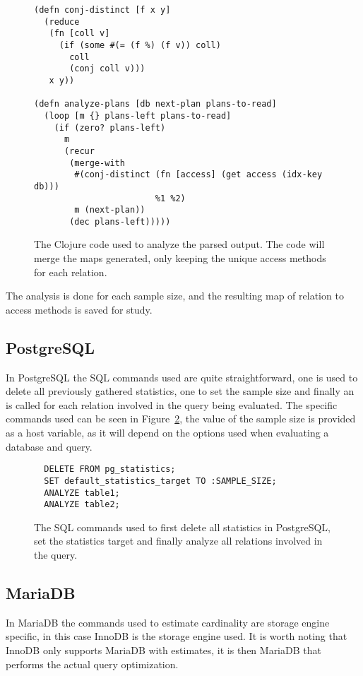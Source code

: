 \begin{figure}[ht]
\begin{verbatim}
(defn conj-distinct [f x y]
  (reduce
   (fn [coll v]
     (if (some #(= (f %) (f v)) coll)
       coll
       (conj coll v)))
   x y))

(defn analyze-plans [db next-plan plans-to-read]
  (loop [m {} plans-left plans-to-read]
    (if (zero? plans-left)
      m
      (recur
       (merge-with
        #(conj-distinct (fn [access] (get access (idx-key db)))
                        %1 %2)
        m (next-plan))
       (dec plans-left)))))
   \end{verbatim}
   \caption[The clojure code to analyze a query]{The Clojure code used to
     analyze the parsed output. The code will merge the maps generated, only
     keeping the unique access methods for each relation.}
\label{fig:clj:analyzing}
\end{figure}

The analysis is done for each sample size, and the resulting map of relation to
access methods is saved for study.

\subsection{PostgreSQL}\label{sec:postgresql}
In PostgreSQL the SQL commands used are quite straightforward, one is used to
delete all previously gathered statistics, one to set the sample size and
finally an  is called for each relation involved in the query being
evaluated. The specific commands used can be seen in
Figure~\ref{fig:sql:pganalyze}, the value of the sample size is provided as a
host variable, as it will depend on the options used when evaluating a database
and query.

\begin{figure}[ht]
\begin{verbatim}
  DELETE FROM pg_statistics;
  SET default_statistics_target TO :SAMPLE_SIZE;
  ANALYZE table1;
  ANALYZE table2;
\end{verbatim}
\caption[Generating new cardinality estimates in PostgreSQL.]{The SQL commands
  used to first delete all statistics in PostgreSQL, set the statistics target
  and finally analyze all relations involved in the query.}
\label{fig:sql:pganalyze}
\end{figure}

\subsection{MariaDB}\label{sec:mariadb}
In MariaDB the commands used to estimate cardinality are storage engine specific,
in this case InnoDB is the storage engine used. It is worth noting that InnoDB only
supports MariaDB with estimates, it is then MariaDB that performs the actual
query optimization.

